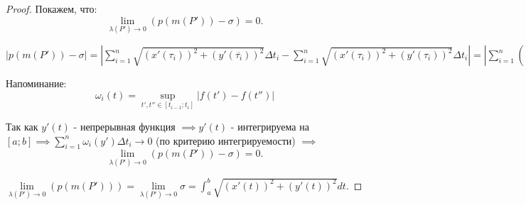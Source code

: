 \documentclass{report}
\theoremstyle{definition}
\begin{document}
\begin{proof}
  Покажем, что:
  \begin{equation*}
    \underset{\lambda(P')\rightarrow0}{\lim}(p(m(P')) - \sigma) = 0.
  \end{equation*}

  $| p(m(P')) - \sigma | = | \sum_{i=1}^{n}\sqrt{(x'(\tau_i))^2 + (y'(\overline{\tau_i}))^2}\Delta t_i
    - \sum_{i=1}^{n}\sqrt{(x'(\tau_i))^2 + (y'(\tau_i))^2}\Delta t_i | = | \sum_{i=1}^{n}(
    \sqrt{(x'(t_i))^2 + (y'(\overline{\tau_i}))^2} - \sqrt{(x'(\tau_i))^2 + (y'(\tau_i))^2})\Delta t_i |
    \leqslant \sum_{i=1}^{n} | \sqrt{(x'(\tau_i))^2 + (y'(\overline{\tau_i}))^2} -
    \sqrt{(x'(\tau_i))^2 + (y'(\tau_i))^2} | \Delta t_i \overset{lemma}{\leqslant} \sum_{i=1}^{n}
    | y'(\overline{\tau_i}) - y'(\tau_i) |\Delta t_i \leqslant \sum_{i=1}^{n}\omega_i(y'(t))\Delta t_i $

  Напоминание:
  \begin{equation*}
    \omega_i(t) = \underset{t',t''\in[t_{i-1};t_i]}{\sup}| f(t') - f(t'') |
  \end{equation*}

  Так как $y'(t)$ - непрерывная функция $\implies y'(t)$ - интегрируема на $[a;b] \implies
    \sum_{i=1}^{n} \omega_i(y')\Delta t_i \rightarrow 0$ (по критерию интегрируемости) $\implies$
  \begin{equation*}
    \underset{\lambda(P')\rightarrow0}{\lim} (p(m(P')) - \sigma) = 0.
  \end{equation*}

  $\underset{\lambda(P')\rightarrow0}{\lim}(p(m(P'))) = \underset{\lambda(P')\rightarrow0}{\lim}\sigma
    = \int_{a}^{b}\sqrt{(x'(t))^2 + (y'(t))^2}dt$.
\end{proof}
\end{document}
